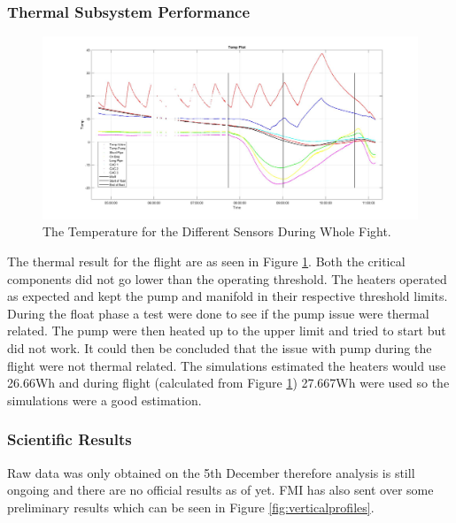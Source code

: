 \subsubsection{Thermal Subsystem Performance}
\begin{figure}[H]
    \centering
    \includegraphics[width=\linewidth]{4-experiment-design/img/Termal_flight_true.jpg}
    \caption{The Temperature for the Different Sensors During Whole Fight.}
    \label{fig:Termal_flight_true}
\end{figure}
The thermal result for the flight are as seen in Figure \ref{fig:Termal_flight_true}. Both the critical components did not go lower than the operating threshold. The heaters operated as expected and kept the pump and manifold in their respective threshold limits. During the float phase a test were done to see if the pump issue were thermal related. The pump were then heated up to the upper limit and tried to start but did not work. It could then be concluded that the issue with pump during the flight were not thermal related. The simulations estimated the heaters would use 26.66Wh and during flight (calculated from Figure \ref{fig:Termal_flight_true}) 27.667Wh were used so the simulations were a good estimation.






\subsubsection{Scientific Results}\label{sec:scientificresults}
Raw data was only obtained on the 5th December therefore analysis is still ongoing and there are no official results as of yet. FMI has also sent over some preliminary results which can be seen in Figure \ref{fig:verticalprofiles}.


